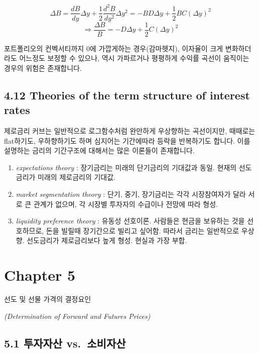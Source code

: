 \documentclass[
  letterpaper,
  DIV=11,
  numbers=noendperiod]{scrreprt}
\providecommand{\tightlist}{%
  \setlength{\itemsep}{0pt}\setlength{\parskip}{0pt}}\usepackage{longtable,booktabs,array}
\begin{document}
\[\Delta B=\frac{dB}{dy}\Delta y+\frac{1}{2}\frac{d^2B}{dy^2}\Delta y^2=-BD\Delta y+\frac{1}{2}BC(\Delta y)^2\]
\[\Rightarrow\frac{\Delta B}{B}=-D\Delta y+\frac{1}{2}C(\Delta y)^2\]

포트폴리오의 컨벡서티까지 0에 가깝게하는 경우(감마헷지), 이자율이 크게
변화하더라도 어느정도 보정할 수 있으나, 역시 가파르거나 평평하게 수익률
곡선이 움직이는 경우의 위험은 존재합니다.

\section*{4.12 Theories of the term structure of interest
rates}\label{theories-of-the-term-structure-of-interest-rates}


제로금리 커브는 일반적으로 로그함수처럼 완만하게 우상향하는 곡선이지만,
때때로는 flat하기도, 우하향하기도 하며 심지어는 기간에따라 등락을
반복하기도 합니다. 이를 설명하는 금리의 기간구조에 대해서는 많은
이론들이 존재합니다.

\begin{enumerate}
\def\labelenumi{\arabic{enumi}.}
\tightlist
\item
  \emph{expectations theory} : 장기금리는 미래의 단기금리의 기대값과
  동일. 현재의 선도금리가 미래의 제로금리의 기대값.
\item
  \emph{market segmentation theory} : 단기, 중기, 장기금리는 각각
  시장참여자가 달라 서로 큰 관계가 없으며, 각 시장별 투자자의 수급이나
  전망에 따라 형성.
\item
  \emph{liquidity preference theory} : 유동성 선호이론. 사람들은 현금을
  보유하는 것을 선호하므로, 돈을 빌릴때 장기간으로 빌리고 싶어함. 따라서
  금리는 일반적으로 우상향. 선도금리가 제로금리보다 높게 형성. 현실과
  가장 부합.
\end{enumerate}

\chapter*{Chapter 5}\label{chapter-5}


선도 및 선물 가격의 결정요인

\emph{(Determination of Forward and Futures Prices)}

\section*{5.1 투자자산
vs.~소비자산}\label{uxd22cuxc790uxc790uxc0b0-vs.-uxc18cuxbe44uxc790uxc0b0}
\end{document}
